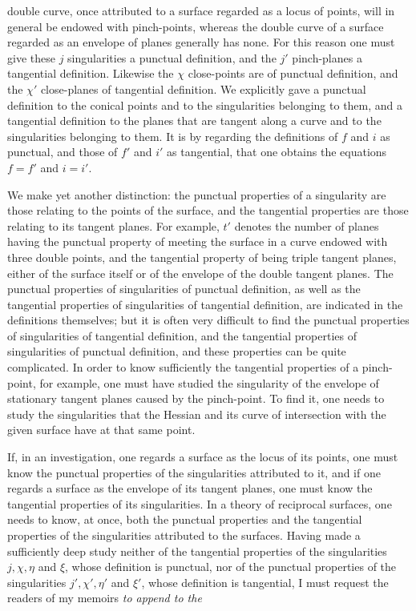 \documentclass{article}
\begin{document}
double curve, once attributed to a surface regarded as a locus of points, will in general be endowed with pinch-points, whereas the double curve of a surface regarded as an envelope of planes generally has none. For this reason one must give these $j$ singularities a punctual definition, and the $j'$ pinch-planes a tangential definition. Likewise the $\chi$ close-points are of punctual definition, and the $\chi'$ close-planes of tangential definition. We explicitly gave a punctual definition to the conical points and to the singularities belonging to them, and a tangential definition to the planes that are tangent along a curve and to the singularities belonging to them. It is by regarding the definitions of $f$ and $i$ as punctual, and those of $f'$ and $i'$ as tangential, that one obtains the equations $f = f'$ and $i = i'$.

We make yet another distinction: the punctual properties of a singularity are those relating to the points of the surface, and the tangential properties are those relating to its tangent planes. For example, $t'$ denotes the number of planes having the punctual property of meeting the surface in a curve endowed with three double points, and the tangential property of being triple tangent planes, either of the surface itself or of the envelope of the double tangent planes. The punctual properties of singularities of punctual definition, as well as the tangential properties of singularities of tangential definition, are indicated in the definitions themselves; but it is often very difficult to find the punctual properties of singularities of tangential definition, and the tangential properties of singularities of punctual definition, and these properties can be quite complicated. In order to know sufficiently the tangential properties of a pinch-point, for example, one must have studied the singularity of the envelope of stationary tangent planes caused by the pinch-point. To find it, one needs to study the singularities that the Hessian and its curve of intersection with the given surface have at that same point.

If, in an investigation, one regards a surface as the locus of its points, one must know the punctual properties of the singularities attributed to it, and if one regards a surface as the envelope of its tangent planes, one must know the tangential properties of its singularities. In a theory of reciprocal surfaces, one needs to know, at once, both the punctual properties and the tangential properties of the singularities attributed to the surfaces. Having made a sufficiently deep study neither of the tangential properties of the singularities $j, \chi, \eta$ and $\xi$, whose definition is punctual, nor of the punctual properties of the singularities $j', \chi', \eta'$ and $\xi'$, whose definition is tangential, I must request the readers of my memoirs \emph{to append to the}
\end{document}
